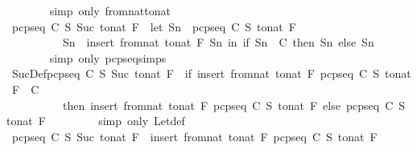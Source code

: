 \begin{isabellebody}
\ \ \ \ \ \ \isamarkupfalse%
\ {\isacharparenleft}simp\ only{\isacharcolon}\ from{\isacharunderscore}nat{\isacharunderscore}to{\isacharunderscore}nat{\isacharparenright}\isanewline
\ \ \ \ \isamarkupfalse%
\ {\isachardoublequoteopen}pcp{\isacharunderscore}seq\ C\ S\ {\isacharparenleft}Suc\ {\isacharparenleft}to{\isacharunderscore}nat\ F{\isacharparenright}{\isacharparenright}\ {\isacharequal}\ {\isacharparenleft}let\ Sn\ {\isacharequal}\ pcp{\isacharunderscore}seq\ C\ S\ {\isacharparenleft}to{\isacharunderscore}nat\ F{\isacharparenright}{\isacharsemicolon}\ \isanewline
\ \ \ \ \ \ \ \ \ \ Sn{}\ {\isacharequal}\ insert\ {\isacharparenleft}from{\isacharunderscore}nat\ {\isacharparenleft}to{\isacharunderscore}nat\ F{\isacharparenright}{\isacharparenright}\ Sn\ in\ if\ Sn{}\ {\isasymin}\ C\ then\ Sn{}\ else\ Sn{\isacharparenright}{\isachardoublequoteclose}\ \isanewline
\ \ \ \ \ \ \isamarkupfalse%
\ {\isacharparenleft}simp\ only{\isacharcolon}\ pcp{\isacharunderscore}seq{\isachardot}simps{\isacharparenleft}{}{\isacharparenright}{\isacharparenright}\isanewline
\ \ \ \ \isamarkupfalse%
\ \isamarkupfalse%
\ SucDef{\isacharcolon}{\isachardoublequoteopen}pcp{\isacharunderscore}seq\ C\ S\ {\isacharparenleft}Suc\ {\isacharparenleft}to{\isacharunderscore}nat\ F{\isacharparenright}{\isacharparenright}\ {\isacharequal}\ {\isacharparenleft}if\ insert\ {\isacharparenleft}from{\isacharunderscore}nat\ {\isacharparenleft}to{\isacharunderscore}nat\ F{\isacharparenright}{\isacharparenright}\ {\isacharparenleft}pcp{\isacharunderscore}seq\ C\ S\ {\isacharparenleft}to{\isacharunderscore}nat\ F{\isacharparenright}{\isacharparenright}\ {\isasymin}\ C\ \isanewline
\ \ \ \ \ \ \ \ \ \ then\ insert\ {\isacharparenleft}from{\isacharunderscore}nat\ {\isacharparenleft}to{\isacharunderscore}nat\ F{\isacharparenright}{\isacharparenright}\ {\isacharparenleft}pcp{\isacharunderscore}seq\ C\ S\ {\isacharparenleft}to{\isacharunderscore}nat\ F{\isacharparenright}{\isacharparenright}\ else\ pcp{\isacharunderscore}seq\ C\ S\ {\isacharparenleft}to{\isacharunderscore}nat\ F{\isacharparenright}{\isacharparenright}{\isachardoublequoteclose}\ \isanewline
\ \ \ \ \ \ \isamarkupfalse%
\ {\isacharparenleft}simp\ only{\isacharcolon}\ Let{\isacharunderscore}def{\isacharparenright}\isanewline
\ \ \ \ \isamarkupfalse%
\ \isamarkupfalse%
\ {\isachardoublequoteopen}pcp{\isacharunderscore}seq\ C\ S\ {\isacharparenleft}Suc\ {\isacharparenleft}to{\isacharunderscore}nat\ F{\isacharparenright}{\isacharparenright}\ {\isacharequal}\ insert\ {\isacharparenleft}from{\isacharunderscore}nat\ {\isacharparenleft}to{\isacharunderscore}nat\ F{\isacharparenright}{\isacharparenright}\ {\isacharparenleft}pcp{\isacharunderscore}seq\ C\ S\ {\isacharparenleft}to{\isacharunderscore}nat\ F{\isacharparenright}{\isacharparenright}{\isachardoublequoteclose}\ \isanewline

\end{isabellebody}

